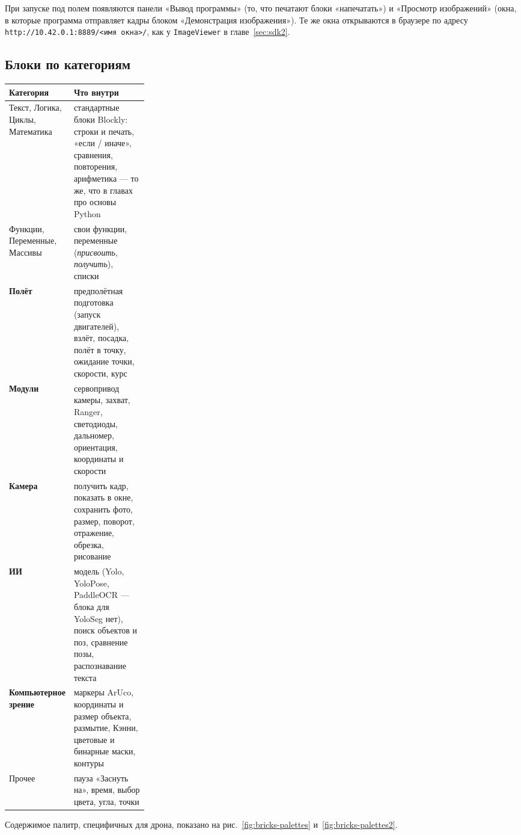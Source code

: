 При запуске под полем появляются панели «Вывод программы» (то, что печатают блоки «напечатать») и «Просмотр изображений» (окна, в которые программа отправляет кадры блоком «Демонстрация изображения»). Те же окна открываются в браузере по адресу \texttt{http://10.42.0.1:8889/<имя окна>/}, как у \verb|ImageViewer| в главе~\ref{sec:sdk2}.

\subsection{Блоки по категориям}

\begin{center}\small
\begin{tabularx}{\linewidth}{@{}>{\raggedright\arraybackslash}p{0.27\linewidth}X@{}}
\toprule
\textbf{Категория} & \textbf{Что внутри} \\
\midrule
Текст, Логика, Циклы, Математика & стандартные блоки Blockly: строки и печать, «если / иначе», сравнения, повторения, арифметика --- то же, что в главах про основы Python \\
Функции, Переменные, Массивы & свои функции, переменные (\emph{присвоить}, \emph{получить}), списки \\
\textbf{Полёт} & предполётная подготовка (запуск двигателей), взлёт, посадка, полёт в точку, ожидание точки, скорости, курс \\
\textbf{Модули} & сервопривод камеры, захват, Ranger, светодиоды, дальномер, ориентация, координаты и скорости \\
\textbf{Камера} & получить кадр, показать в окне, сохранить фото, размер, поворот, отражение, обрезка, рисование \\
\textbf{ИИ} & модель (Yolo, YoloPose, PaddleOCR --- блока для YoloSeg нет), поиск объектов и поз, сравнение позы, распознавание текста \\
\textbf{Компьютерное зрение} & маркеры ArUco, координаты и размер объекта, размытие, Кэнни, цветовые и бинарные маски, контуры \\
Прочее & пауза «Заснуть на», время, выбор цвета, угла, точки \\
\bottomrule
\end{tabularx}
\end{center}

Содержимое палитр, специфичных для дрона, показано на рис.~\ref{fig:bricks-palettes} и~\ref{fig:bricks-palettes2}.

